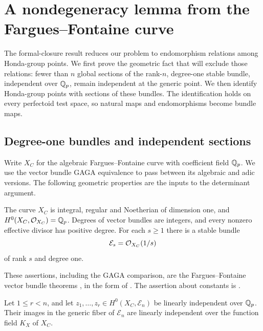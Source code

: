 \section{A nondegeneracy lemma from the Fargues--Fontaine curve}
\label{sec:bundles}

The formal-closure result reduces our problem to endomorphism relations
among Honda-group points. We first prove the geometric fact that will
exclude those relations: fewer than $n$ global sections of the rank-$n$,
degree-one stable bundle, independent over $\mathbb Q_p$, remain independent at
the generic point. We then identify Honda-group points with sections of
these bundles. The identification holds on every perfectoid test space, so
natural maps and endomorphisms become bundle maps.

\subsection{Degree-one bundles and independent sections}

Write $X_C$ for the algebraic Fargues--Fontaine curve with coefficient
field $\mathbb Q_p$. We use the vector bundle GAGA equivalence to pass between
its algebraic and adic versions. The following geometric properties
are the inputs to the determinant argument.

\begin{theorem}\label{bundles:geometry}
The curve $X_C$ is integral, regular and Noetherian of dimension one,
and $H^0(X_C,\mathcal O_{X_C})=\mathbb Q_p$.  Degrees of vector bundles are integers,
and every nonzero effective divisor has positive degree.  For each
$s\geq1$ there is a stable bundle
\[
  \mathcal E_s=\mathcal O_{X_C}(1/s)
\]
of rank $s$ and degree one.
\end{theorem}

These assertions, including the GAGA comparison, are the
Fargues--Fontaine vector bundle theorems \cite{FF18}, in the form
of \cite[\S\,II.2.3--II.2.4, especially
Propositions~II.2.7, II.2.9--II.2.10 and Example~II.2.11]{FS21}.
The assertion about constants is
\cite[Proposition~II.2.5\textup{(ii)}]{FS21}.

\begin{lemma}
\label{bundles:independence}
Let $1\leq r<n$, and let
$z_1,\ldots,z_r\in H^0(X_C,\mathcal E_n)$ be linearly independent
over $\mathbb Q_p$.  Their images in the generic fiber of $\mathcal E_n$
are linearly independent over the function field $K_X$ of $X_C$.
\end{lemma}

